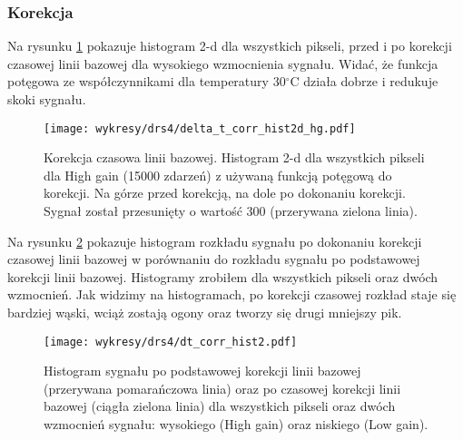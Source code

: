 \documentclass[a4paper,11pt,twoside]{article}
\begin{document}
\subsubsection{Korekcja}
Na rysunku \ref{fig:dt_corr_hist2d_all} pokazuje histogram 2-d dla wszystkich pikseli, przed i po korekcji czasowej linii bazowej dla wysokiego wzmocnienia sygnału. Widać, że funkcja potęgowa ze współczynnikami dla temperatury 30$^{\circ}$C działa dobrze i redukuje skoki sygnału.

\begin{figure}[H] 
\centering
\texttt{[image: wykresy/drs4/delta\_t\_corr\_hist2d\_hg.pdf]}
\caption{Korekcja czasowa linii bazowej. Histogram 2-d dla wszystkich pikseli dla High gain (15000 zdarzeń) z używaną funkcją potęgową do korekcji. Na górze przed korekcją, na dole po dokonaniu korekcji. Sygnał został przesunięty o wartość 300 (przerywana zielona linia). }
\label{fig:dt_corr_hist2d_all}
\end{figure}


Na rysunku \ref{fig:dt_corr_hist} pokazuje histogram rozkładu sygnału po dokonaniu korekcji czasowej linii bazowej w porównaniu do rozkładu sygnału po podstawowej korekcji linii bazowej. Histogramy zrobiłem dla wszystkich pikseli oraz dwóch wzmocnień. Jak widzimy na histogramach, po korekcji czasowej rozkład staje się bardziej wąski, wciąż zostają ogony oraz tworzy się drugi mniejszy pik. 
\begin{figure}[H] 
\centering
\texttt{[image: wykresy/drs4/dt\_corr\_hist2.pdf]}
\caption{Histogram sygnału po podstawowej korekcji linii bazowej (przerywana pomarańczowa linia) oraz po czasowej korekcji linii bazowej (ciągła zielona linia) dla wszystkich pikseli oraz dwóch wzmocnień sygnału: wysokiego (High gain) oraz niskiego (Low gain). }
\label{fig:dt_corr_hist}
\end{figure}
\newpage
\end{document}
